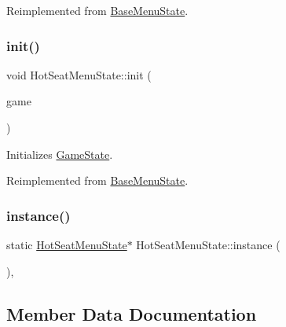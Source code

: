 Reimplemented from \mbox{\hyperlink{class_base_menu_state_a6ca2a29b45a0c2d6d2cbbb6ee67d38ac}{Base\+Menu\+State}}.

\mbox{\label{class_hot_seat_menu_state_a29beb4656c180d0cfc3b8ca20ae2d172}} 
\subsubsection{\texorpdfstring{init()}{init()}}
{\footnotesize\ttfamily void Hot\+Seat\+Menu\+State\+::init (\begin{DoxyParamCaption}\item[{\mbox{\hyperlink{class_game_engine}{Game\+Engine}} $\ast$}]{game }\end{DoxyParamCaption})\hspace{0.3cm}{\ttfamily [virtual]}}



Initializes \mbox{\hyperlink{class_game_state}{Game\+State}}. 



Reimplemented from \mbox{\hyperlink{class_base_menu_state_ae29d522c56a4582ce79e113426421741}{Base\+Menu\+State}}.

\mbox{\label{class_hot_seat_menu_state_aaeccf26a726ce9793b0e6acf104c21b6}} 
\subsubsection{\texorpdfstring{instance()}{instance()}}
{\footnotesize\ttfamily static \mbox{\hyperlink{class_hot_seat_menu_state}{Hot\+Seat\+Menu\+State}}$\ast$ Hot\+Seat\+Menu\+State\+::instance (\begin{DoxyParamCaption}{ }\end{DoxyParamCaption})\hspace{0.3cm}{\ttfamily [inline]}, {\ttfamily [static]}}



\subsection{Member Data Documentation}
\mbox{\label{class_hot_seat_menu_state_a5bb9a6757abc66a4b40329feb31c136b}} 
